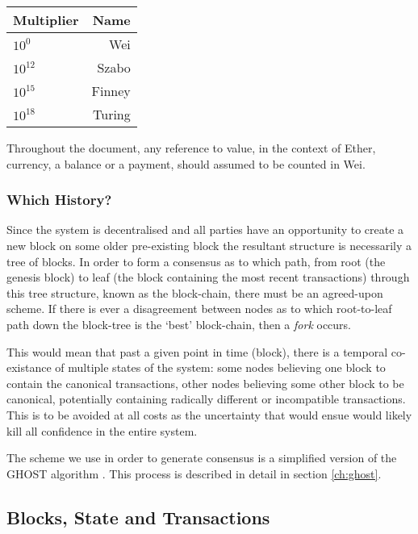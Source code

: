 \documentclass[9pt,oneside]{amsart}
\begin{document}
\begin{multicols}{2}
\par\bigskip
\begin{center}
\begin{tabular}{lr}
\toprule
Multiplier & Name \\
\midrule
$10^0$ & Wei \\
$10^{12}$ & Szabo \\
$10^{15}$ & Finney \\
$10^{18}$ & Turing \\
\bottomrule
\end{tabular}
\end{center}
\par

Throughout the document, any reference to value, in the context of Ether, currency, a balance or a payment, should assumed to be counted in Wei. 

\subsubsection{Which History?}

Since the system is decentralised and all parties have an opportunity to create a new block on some older pre-existing block the resultant structure is necessarily a tree of blocks. In order to form a consensus as to which path, from root (the genesis block) to leaf (the block containing the most recent transactions) through this tree structure, known as the block-chain, there must be an agreed-upon scheme. If there is ever a disagreement between nodes as to which root-to-leaf path down the block-tree is the `best' block-chain, then a \textit{fork} occurs.

This would mean that past a given point in time (block), there is a temporal co-existance of multiple states of the system: some nodes believing one block to contain the canonical transactions, other nodes believing some other block to be canonical, potentially containing radically different or incompatible transactions. This is to be avoided at all costs as the uncertainty that would ensue would likely kill all confidence in the entire system.

The scheme we use in order to generate consensus is a simplified version of the GHOST algorithm \cite{ghost}. This process is described in detail in section \ref{ch:ghost}.

\subsection{Blocks, State and Transactions} \label{ch:bst}


\end{multicols}
\end{document}
